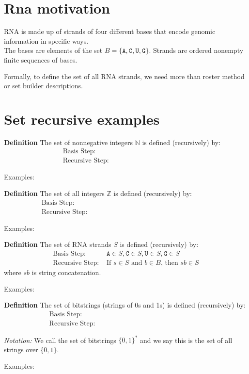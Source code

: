 \documentclass[12pt, oneside]{article}
\newcommand{\A}[0]{\texttt{A}}
\newcommand{\C}[0]{\texttt{C}}
\newcommand{\G}[0]{\texttt{G}}
\newcommand{\U}[0]{\texttt{U}}
\begin{document}
\section*{Rna motivation}


RNA is made up of strands of four different bases that encode genomic information
in specific ways.\\
The bases are elements of the set 
$B  = \{\A, \C, \U, \G \}$.
Strands are ordered nonempty finite sequences of bases.

Formally, to define the set of all RNA strands, we need more than roster
method or set builder descriptions. 

 \vfill
\section*{Set recursive examples}


{\bf Definition} The set of nonnegative integers $\mathbb{N}$ is defined (recursively) by: 
\[
\begin{array}{ll}
\textrm{Basis Step: } & \phantom{0 \in \mathbb{N}} \\
\textrm{Recursive Step: } & \phantom{\textrm{If } n \in \mathbb{N} \textrm{, then } n+1 \in \mathbb{N}}
\end{array}
\]

Examples: 

{\bf Definition} The set of all integers $\mathbb{Z}$ is defined (recursively) by: 
\[
\begin{array}{ll}
\textrm{Basis Step: } & \phantom{0 \in \mathbb{Z}} \\
\textrm{Recursive Step: } & \phantom{\textrm{If } x \in \mathbb{Z} \textrm{, then } x+1 \in \mathbb{Z}
\textrm{ and } x-1 \in \mathbb{Z}}
\end{array}
\]

Examples: 

\vfill

{\bf Definition} The set of RNA strands $S$ is defined (recursively) by:
\[
\begin{array}{ll}
\textrm{Basis Step: } & \A \in S, \C \in S, \U \in S, \G \in S \\
\textrm{Recursive Step: } & \textrm{If } s \in S\textrm{ and }b \in B \textrm{, then }sb \in S
\end{array}
\]
where $sb$ is string concatenation.

Examples: 

\vfill

{\bf Definition} The set of bitstrings (strings of 0s and 1s) is defined (recursively) by:
\[
\begin{array}{ll}
\textrm{Basis Step: } & \phantom{\lambda \in X} \\
\textrm{Recursive Step: } & \phantom{\textrm{If } s \in X \textrm{, then } s0 \in X \text{ and } s1 \in X}
\end{array}
\]

{\it Notation:} We call the set of bitstrings $\{0,1\}^*$ and we say 
this is the set of all strings over $\{0,1\}$.

Examples: 

\vfill \vfill
\end{document}
